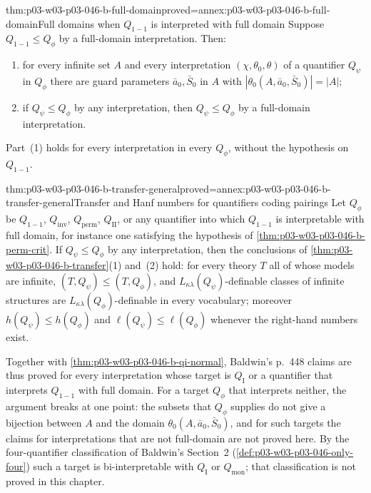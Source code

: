 \begin{hblemma}{thm:p03-w03-p03-046-b-full-domain}{proved=annex:p03-w03-p03-046-b-full-domain}{Full domains when \(Q_{1-1}\) is interpreted with full domain}
Suppose \(Q_{1-1}\le Q_\phi\) by a full-domain interpretation. Then:
\begin{enumerate}
  \item for every infinite set \(A\) and every interpretation
        \((\chi,\theta_0,\theta)\) of a quantifier \(Q_\psi\) in \(Q_\phi\)
        there are guard parameters \(\bar a_0,\bar S_0\) in \(A\) with
        \(|\theta_0(A,\bar a_0,\bar S_0)|=|A|\);
  \item if \(Q_\psi\le Q_\phi\) by any interpretation, then
        \(Q_\psi\le Q_\phi\) by a full-domain interpretation.
\end{enumerate}
Part~(1) holds for every interpretation in every \(Q_\phi\), without the
hypothesis on \(Q_{1-1}\).
\end{hblemma}

\begin{hbcorollary}{thm:p03-w03-p03-046-b-transfer-general}{proved=annex:p03-w03-p03-046-b-transfer-general}{Transfer and Hanf numbers for quantifiers coding pairings}
Let \(Q_\phi\) be \(Q_{1-1}\), \(Q_{\mathrm{inv}}\), \(Q_{\mathrm{perm}}\),
\(Q_{\mathrm{II}}\), or any quantifier into which \(Q_{1-1}\) is
interpretable with full domain, for instance one satisfying the hypothesis
of \cref{thm:p03-w03-p03-046-b-perm-crit}. If \(Q_\psi\le Q_\phi\) by any
interpretation, then the conclusions of
\cref{thm:p03-w03-p03-046-b-transfer}(1) and~(2) hold: for every theory
\(T\) all of whose models are infinite, \((T,Q_\psi)\le(T,Q_\phi)\), and
\(L_{\kappa\lambda}(Q_\psi)\)-definable classes of infinite structures are
\(L_{\kappa\lambda}(Q_\phi)\)-definable in every vocabulary; moreover
\(h(Q_\psi)\le h(Q_\phi)\) and \(\ell(Q_\psi)\le\ell(Q_\phi)\) whenever the
right-hand numbers exist.
\end{hbcorollary}

Together with \cref{thm:p03-w03-p03-046-b-qi-normal}, Baldwin's p.~448
claims are thus proved for every interpretation whose target is
\(Q_{\mathrm I}\) or a quantifier that interprets \(Q_{1-1}\) with full
domain. For a target \(Q_\phi\) that interprets neither, the argument
breaks at one point: the subsets that \(Q_\phi\) supplies do not give a
bijection between \(A\) and the domain \(\theta_0(A,\bar a_0,\bar S_0)\),
and for such targets the claims for interpretations that are not
full-domain are not proved here. By the four-quantifier classification of
Baldwin's Section~2 (\cref{def:p03-w03-p03-046-only-four}) such a target is
bi-interpretable with \(Q_{\mathrm I}\) or \(Q_{\mathrm{mon}}\); that
classification is not proved in this chapter.

